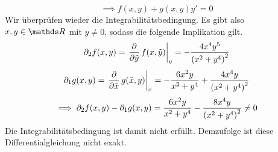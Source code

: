 \begin{atiSolution}
\begin{atiSubtaskSolutions}
{\begin{atiSubtaskSolutions}
{\[          \]
          \[
            \implies f(x,y) + g(x,y)y' = 0
          \]
          Wir überprüfen wieder die Integrabilitätsbedingung.
          Es gibt also $x,y\in\setReal$ mit $y\neq 0$, sodass die folgende Implikation gilt.
          \[
            \partial_2f(x,y) = \leibnizPartialDerivativeOperatorValue{\tilde{y}}{f(x,\tilde{y})}{y} = -\frac{4x^4y^5}{\roundBrackets{x^2+y^4}^2}
          \]
          \[
            \partial_1g(x,y) = \leibnizPartialDerivativeOperatorValue{\tilde{x}}{g(\tilde{x},y)}{x} = -\frac{6x^2y}{x^2+y^4} + \frac{4x^4y}{\roundBrackets{x^2+y^4}^2}
          \]
          \[
            \implies \partial_2f(x,y) - \partial_1g(x,y) = \frac{6x^2y}{x^2+y^4} - \frac{8x^4y}{\left( x^2+y^4 \right)^2} \neq 0
          \]
          Die Integrabilitätsbedingung ist damit nicht erfüllt.
          \atiPoints[1]Demzufolge ist diese Differentialgleichung nicht exakt.
        }
      \end{atiSubtaskSolutions}
    }
  \end{atiSubtaskSolutions}
\end{atiSolution}